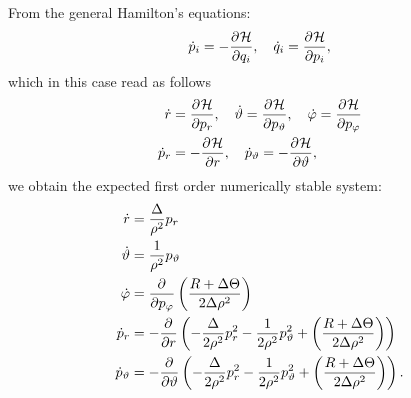 From the general Hamilton's equations:
\[
	\dot{p}_i = -\frac{\partial^{} \mathcal{H}}{\partial q_i}, \quad \dot{q}_i = \frac{\partial^{} \mathcal{H}}{\partial p_i},
\]
which in this case read as follows
\begin{align*}
	\dot{r} &= \frac{\partial^{} \mathcal{H}}{\partial p_r}, \quad \dot{\vartheta} = \frac{\partial^{} \mathcal{H}}{\partial p_\vartheta}, \quad \dot{\varphi} = \frac{\partial^{} \mathcal{H}}{\partial p_\varphi} \\
	\dot{p}_r &= - \frac{\partial^{} \mathcal{H}}{\partial r}, \quad \dot{p}_\vartheta = - \frac{\partial^{} \mathcal{H}}{\partial \vartheta},
\end{align*}
we obtain the expected first order numerically stable system:
\begin{align}
	\dot{r} &= \frac{\Delta}{\rho^2} p_r \\
	\dot{\vartheta} &= \frac{1}{\rho^2}p_\vartheta \\
	\dot{\varphi} &= \frac{\partial^{} }{\partial p_\varphi}\left( \frac{R + \Delta\Theta}{2\Delta\rho^2} \right) \\
	\dot{p}_r &= - \frac{\partial^{} }{\partial r} \left( - \frac{\Delta}{2\rho^2}p_r^2 - \frac{1}{2\rho^2}p_\vartheta^2 + \left( \frac{R + \Delta\Theta}{2\Delta\rho^2} \right) \right) \\
	\dot{p}_\vartheta &= - \frac{\partial^{} }{\partial \vartheta} \left( - \frac{\Delta}{2\rho^2}p_r^2 - \frac{1}{2\rho^2}p_\vartheta^2 + \left( \frac{R + \Delta\Theta}{2\Delta\rho^2} \right) \right).
\end{align}